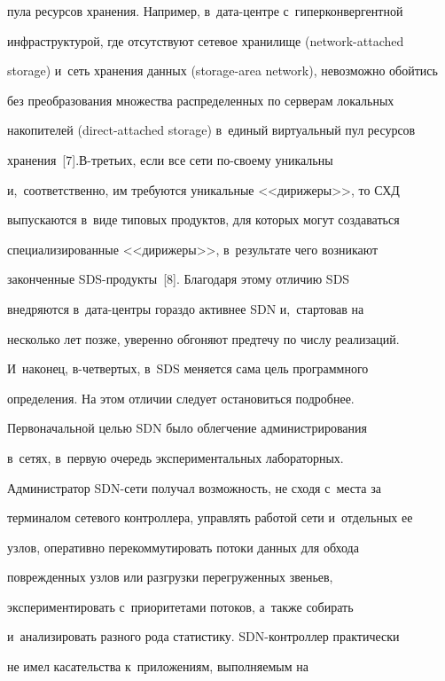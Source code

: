 пула ресурсов хранения. Например, в~да\-та-цент\-ре с~гиперконвергентной 


инфраструктурой, где отсутствуют сетевое хранилище (network-attached 


storage) и~сеть хранения данных (storage-area network), невозможно обойтись 


без преобразования множества распределенных по серверам локальных 


накопителей (direct-attached storage) в~единый виртуальный пул ресурсов 


хранения~[7].\linebreak В-треть\-их, если все сети по-сво\-ему уникальны 


и,~соответственно, им требуются уникальные <<дирижеры>>, то СХД 


выпускаются в~виде типовых продуктов, для которых могут создаваться 


специализированные <<дирижеры>>, в~результате чего возникают 


законченные SDS-про\-дук\-ты~[8]. Благодаря этому отличию SDS 


внедряются в~да\-та-цент\-ры гораздо активнее SDN и,~стартовав на 


несколько лет позже, уверенно обгоняют предтечу по числу реализаций. 


И~наконец, в-чет\-вер\-тых, в~SDS меняется сама цель программного 


определения. На этом отличии следует остановиться под\-роб\-нее.


    


    Первоначальной целью SDN было облегчение администрирования 


в~сетях, в~первую очередь экспериментальных лабораторных. 


Администратор SDN-се\-ти получал возможность, не сходя с~места за 


терминалом сетевого контроллера, управлять работой сети и~отдельных ее 


узлов, оперативно перекоммутировать потоки данных для обхода 


поврежденных узлов или разгрузки перегруженных звеньев, 


экспериментировать с~приоритетами потоков, а~так\-же собирать 


и~анализировать разного рода статистику. SDN-конт\-рол\-лер практически 


не имел касательства к~приложениям, вы\-пол\-ня\-емым на  


